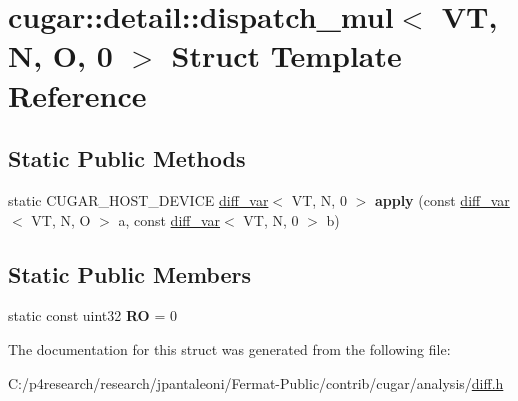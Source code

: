 \hypertarget{structcugar_1_1detail_1_1dispatch__mul_3_01_v_t_00_01_n_00_01_o_00_010_01_4}{}\section{cugar\+:\+:detail\+:\+:dispatch\+\_\+mul$<$ VT, N, O, 0 $>$ Struct Template Reference}
\label{structcugar_1_1detail_1_1dispatch__mul_3_01_v_t_00_01_n_00_01_o_00_010_01_4}
\subsection*{Static Public Methods}
\begin{DoxyCompactItemize}
\item 
\mbox{\label{structcugar_1_1detail_1_1dispatch__mul_3_01_v_t_00_01_n_00_01_o_00_010_01_4_a1e47c02ec6b5cb15963f7070e05a3e17}} 
static C\+U\+G\+A\+R\+\_\+\+H\+O\+S\+T\+\_\+\+D\+E\+V\+I\+CE \hyperlink{structcugar_1_1diff__var}{diff\+\_\+var}$<$ VT, N, 0 $>$ {\bfseries apply} (const \hyperlink{structcugar_1_1diff__var}{diff\+\_\+var}$<$ VT, N, O $>$ a, const \hyperlink{structcugar_1_1diff__var}{diff\+\_\+var}$<$ VT, N, 0 $>$ b)
\end{DoxyCompactItemize}
\subsection*{Static Public Members}
\begin{DoxyCompactItemize}
\item 
\mbox{\label{structcugar_1_1detail_1_1dispatch__mul_3_01_v_t_00_01_n_00_01_o_00_010_01_4_a44c841857bc496bc95bdf0f8d3c7b934}} 
static const uint32 {\bfseries RO} = 0
\end{DoxyCompactItemize}


The documentation for this struct was generated from the following file\+:\begin{DoxyCompactItemize}
\item 
C\+:/p4research/research/jpantaleoni/\+Fermat-\/\+Public/contrib/cugar/analysis/\hyperlink{diff_8h}{diff.\+h}\end{DoxyCompactItemize}
